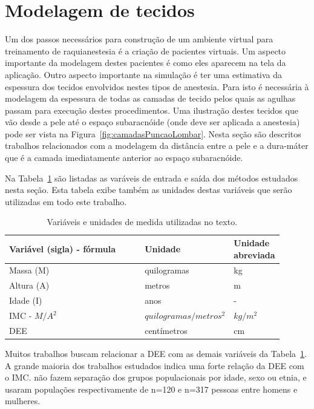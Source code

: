 \section{Modelagem de tecidos}
\label{sec:modelagemTecidos}

Um dos passos necessários para construção de um ambiente virtual para treinamento de raquianestesia é a criação de pacientes virtuais. Um aspecto importante da modelagem destes pacientes é como eles aparecem na tela da aplicação. Outro aspecto importante na simulação é ter uma estimativa da espessura dos tecidos envolvidos nestes tipos de anestesia. Para isto é necessária à modelagem da espessura de todas as camadas de tecido pelos quais as agulhas passam para execução destes procedimentos. Uma ilustração destes tecidos que vão desde a pele até o espaço subaracnóide (onde deve ser aplicada a anestesia) pode ser vista na Figura~\ref{fig:camadasPuncaoLombar}. Nesta seção são descritos trabalhos relacionados com a modelagem da distância entre a pele e a dura-máter que é a camada imediatamente anterior ao espaço subaracnóide.

Na Tabela~\ref{tab:variaveisUnidades} são listadas as varáveis de entrada e saída dos métodos estudados nesta seção. Esta tabela exibe também as unidades destas variáveis que serão utilizadas em todo este trabalho.

\begin{table}[!ht]
\begin{center}
\caption{Variáveis e unidades de medida utilizadas no texto.}
\label{tab:variaveisUnidades}
\begin{tabular}{|p{0.52\linewidth}|p{0.25\linewidth}|p{0.13\linewidth}|}
\hline
\textbf{Variável (sigla) - fórmula} & \textbf{Unidade} & \textbf{Unidade abreviada}\\
\hline\hline
Massa (M) & quilogramas & kg \\
Altura (A) & metros & m \\
Idade (I) & anos & - \\
\acrfull{IMC} - $M/A^2$ & $quilogramas/metros^2$ & $kg/m^2$ \\
\acrfull{DEE} & centímetros & cm \\
\hline
\end{tabular}
\end{center}
\end{table}

Muitos trabalhos buscam relacionar a \acrfull{DEE} com as demais variáveis da Tabela~\ref{tab:variaveisUnidades}. A grande maioria dos trabalhos estudados indica uma forte relação da \acrshort{DEE} com o \acrshort{IMC}. \textcite{Adegboye2017, Galbraith2018} não fazem separação dos grupos populacionais por idade, sexo ou etnia, e usaram populações respectivamente de n=120 e n=317 pessoas entre homens e mulheres.

